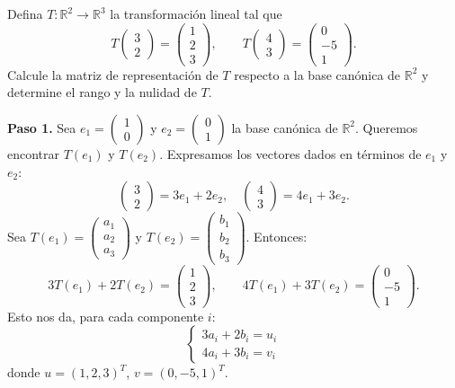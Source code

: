 \begin{prob}
Defina $T: \mathbb{R}^2 \rightarrow \mathbb{R}^3$ la transformación lineal tal que
\[
T\begin{pmatrix} 3 \\ 2 \end{pmatrix} = \begin{pmatrix} 1 \\ 2 \\ 3 \end{pmatrix}, \qquad
T\begin{pmatrix} 4 \\ 3 \end{pmatrix} = \begin{pmatrix} 0 \\ -5 \\ 1 \end{pmatrix}.
\]
Calcule la matriz de representación de $T$ respecto a la base canónica de $\mathbb{R}^2$ y determine el rango y la nulidad de $T$.
\begin{myproof}
\textbf{Paso 1.} Sea $e_1 = \begin{pmatrix} 1 \\ 0 \end{pmatrix}$ y $e_2 = \begin{pmatrix} 0 \\ 1 \end{pmatrix}$ la base canónica de $\mathbb{R}^2$. Queremos encontrar $T(e_1)$ y $T(e_2)$. Expresamos los vectores dados en términos de $e_1$ y $e_2$:
\[
\begin{pmatrix} 3 \\ 2 \end{pmatrix} = 3e_1 + 2e_2, \quad
\begin{pmatrix} 4 \\ 3 \end{pmatrix} = 4e_1 + 3e_2.
\]
Sea $T(e_1) = \begin{pmatrix} a_1 \\ a_2 \\ a_3 \end{pmatrix}$ y $T(e_2) = \begin{pmatrix} b_1 \\ b_2 \\ b_3 \end{pmatrix}$. Entonces:
\[
3T(e_1) + 2T(e_2) = \begin{pmatrix} 1 \\ 2 \\ 3 \end{pmatrix}, \qquad
4T(e_1) + 3T(e_2) = \begin{pmatrix} 0 \\ -5 \\ 1 \end{pmatrix}.
\]
Esto nos da, para cada componente $i$:
\[
\begin{cases}
3a_i + 2b_i = u_i \\
4a_i + 3b_i = v_i
\end{cases}
\]
donde $u = (1,2,3)^T$, $v = (0,-5,1)^T$.


\end{myproof}
\end{prob}
